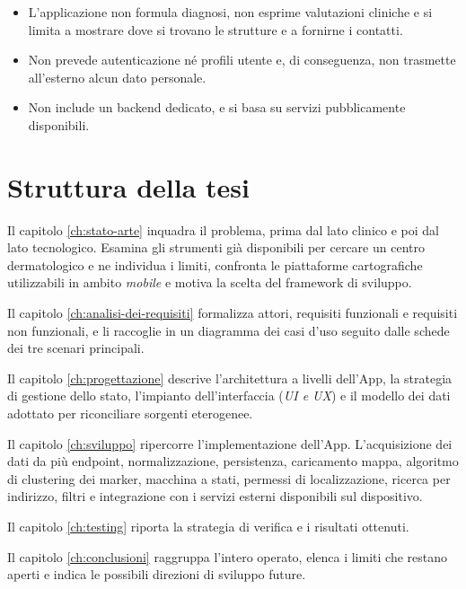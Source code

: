 \begin{itemize}
  \item L'applicazione non formula diagnosi, non esprime valutazioni cliniche e si limita a mostrare dove si trovano le strutture
  e a fornirne i contatti.
  \item Non prevede autenticazione né profili utente e, di conseguenza, non trasmette all'esterno alcun dato personale.
  \item Non include un backend dedicato, e si basa su servizi pubblicamente disponibili. %
\end{itemize}




\section{Struttura della tesi}\label{sec:struttura-tesi}

Il capitolo \ref{ch:stato-arte} inquadra il problema, prima dal lato clinico e poi dal lato tecnologico.
Esamina gli strumenti già disponibili per cercare un centro dermatologico e ne individua i limiti, confronta le piattaforme cartografiche utilizzabili
in ambito \textit{mobile} e motiva la scelta del framework di sviluppo.

Il capitolo \ref{ch:analisi-dei-requisiti} formalizza attori, requisiti funzionali e requisiti non funzionali, e li raccoglie
in un diagramma dei casi d'uso seguito dalle schede dei tre scenari principali.

Il capitolo \ref{ch:progettazione} descrive l'architettura a livelli dell'App, la strategia di gestione dello stato,
l'impianto dell'interfaccia (\textit{UI e UX}) e il modello dei dati adottato per riconciliare sorgenti eterogenee.

Il capitolo \ref{ch:sviluppo} ripercorre l'implementazione dell'App.
L'acquisizione dei dati da più endpoint, normalizzazione, persistenza, caricamento mappa, algoritmo di clustering dei marker, macchina a stati,
permessi di localizzazione, ricerca per indirizzo, filtri e integrazione con i servizi esterni disponibili sul dispositivo.

Il capitolo \ref{ch:testing} riporta la strategia di verifica e i risultati ottenuti.

Il capitolo \ref{ch:conclusioni} raggruppa l'intero operato, elenca i limiti che restano aperti e indica le possibili direzioni di
sviluppo future.

